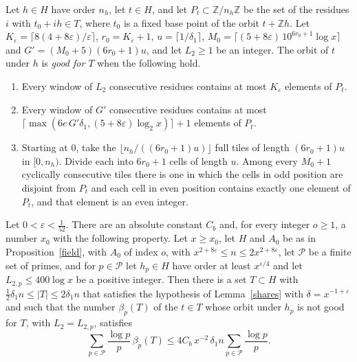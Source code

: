\begin{definition}\label{def:goodorbit}
Let $h\in H$ have order $n_h$, let $t\in H$, and let $P_t\subset\mathbb Z/n_h\mathbb Z$ be the set of the residues $i$ with $t_0+ih\in T$, where $t_0$ is a fixed base point of the orbit $t+\mathbb Zh$. Let $K_\varepsilon=\lceil8(4+8\varepsilon)/\varepsilon\rceil$, $r_0=K_\varepsilon+1$, $u=\lceil1/\delta_1\rceil$, $M_0=\lceil(5+8\varepsilon)\,10^{6r_0+1}\log x\rceil$ and $G'=(M_0+5)(6r_0+1)u$, and let $L_2\ge1$ be an integer. The orbit of $t$ under $h$ is \emph{good for $T$} when the following hold.
\begin{enumerate}
\item[(i)] Every window of $L_2$ consecutive residues contains at most $K_\varepsilon$ elements of $P_t$.
\item[(ii)] Every window of $G'$ consecutive residues contains at most $\lceil\max(6e\,G'\delta_1,(5+8\varepsilon)\log_2x)\rceil+1$ elements of $P_t$.
\item[(iii)] Starting at $0$, take the $\lfloor n_h/((6r_0+1)u)\rfloor$ full tiles of length $(6r_0+1)u$ in $[0,n_h)$. Divide each into $6r_0+1$ cells of length $u$. Among every $M_0+1$ cyclically consecutive tiles there is one in which the cells in odd position are disjoint from $P_t$ and each cell in even position contains exactly one element of $P_t$, and that element is an even integer.
\end{enumerate}
\end{definition}

\begin{proposition}\label{tops}
Let $0<\varepsilon<\frac1{52}$. There are an absolute constant $C_b$ and, for every integer $o\ge1$, a number $x_0$ with the following property. Let $x\ge x_0$, let $H$ and $A_0$ be as in Proposition~\ref{field}, with $A_0$ of index $o$, with $x^{2+8\varepsilon}\le n\le2x^{2+8\varepsilon}$, let $\mathcal P$ be a finite set of primes, and for $p\in\mathcal P$ let $h_p\in H$ have order at least $x^{\varepsilon/4}$ and let $L_{2,p}\le400\log x$ be a positive integer. Then there is a set $T\subset H$ with $\frac12\delta_1n\le\lvert T\rvert\le2\delta_1n$ that satisfies the hypothesis of Lemma~\ref{shares} with $\delta=x^{-1+\varepsilon}$ and such that the number $\beta_p(T)$ of the $t\in T$ whose orbit under $h_p$ is not good for $T$, with $L_2=L_{2,p}$, satisfies
\[
\sum_{p\in\mathcal P}\frac{\log p}p\,\beta_p(T)\le4C_b\,x^{-2}\,\delta_1n\sum_{p\in\mathcal P}\frac{\log p}p .
\]
\end{proposition}

